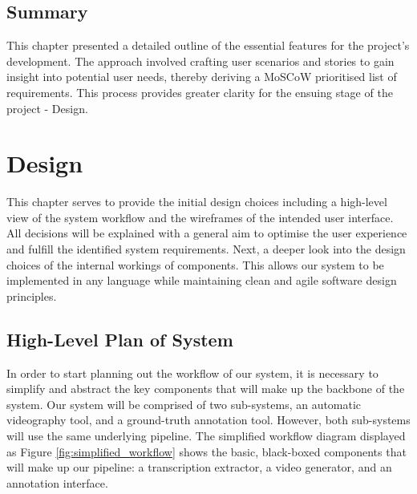 \documentclass{l4proj}
\begin{document}
\section{Summary}
This chapter presented a detailed outline of the essential features for the project's development. The approach involved crafting user scenarios and stories to gain insight into potential user needs, thereby deriving a MoSCoW prioritised list of requirements. This process provides greater clarity for the ensuing stage of the project - Design.




\chapter{Design}
This chapter serves to provide the initial design choices including a high-level view of the system workflow and the wireframes of the intended user interface. All decisions will be explained with a general aim to optimise the user experience and fulfill the identified system requirements. Next, a deeper look into the design choices of the internal workings of components. This allows our system to be implemented in any language while maintaining clean and agile software design principles. 

\section{High-Level Plan of System}
In order to start planning out the workflow of our system, it is necessary to simplify and abstract the key components that will make up the backbone of the system. Our system will be comprised of two sub-systems, an automatic videography tool, and a ground-truth annotation tool. However, both sub-systems will use the same underlying pipeline. The simplified workflow diagram displayed as Figure \ref{fig:simplified_workflow} shows the basic, black-boxed components that will make up our pipeline: a transcription extractor, a video generator, and an annotation interface.
\end{document}
